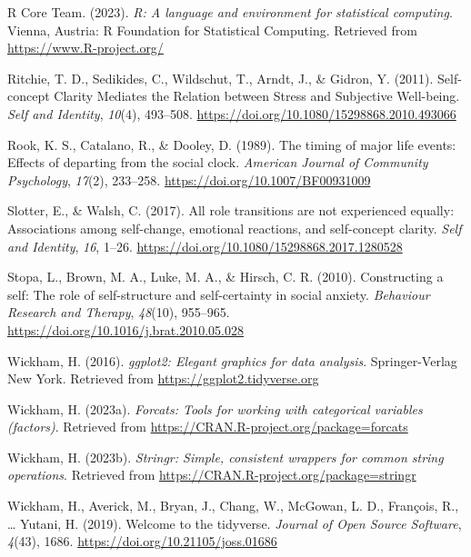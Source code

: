 \documentclass[
  man,floatsintext]{apa6}
\newlength{\cslhangindent}
\newlength{\cslentryspacingunit} %
\newenvironment{CSLReferences}[2] %
 {%
  \setlength{\parindent}{0pt}
  \ifodd #1
  \let\oldpar\par
  \def\par{\hangindent=\cslhangindent\oldpar}
  \fi
  \setlength{\parskip}{#2\cslentryspacingunit}
 }%
 {}
\begin{document}
\begin{CSLReferences}{1}{0}
\leavevmode{}%
R Core Team. (2023). \emph{R: A language and environment for statistical computing}. Vienna, Austria: R Foundation for Statistical Computing. Retrieved from \url{https://www.R-project.org/}

\leavevmode{}%
Ritchie, T. D., Sedikides, C., Wildschut, T., Arndt, J., \& Gidron, Y. (2011). Self-concept {Clarity Mediates} the {Relation} between {Stress} and {Subjective Well-being}. \emph{Self and Identity}, \emph{10}(4), 493--508. \url{https://doi.org/10.1080/15298868.2010.493066}

\leavevmode{}%
Rook, K. S., Catalano, R., \& Dooley, D. (1989). The timing of major life events: {Effects} of departing from the social clock. \emph{American Journal of Community Psychology}, \emph{17}(2), 233--258. \url{https://doi.org/10.1007/BF00931009}

\leavevmode{}%
Slotter, E., \& Walsh, C. (2017). All role transitions are not experienced equally: {Associations} among self-change, emotional reactions, and self-concept clarity. \emph{Self and Identity}, \emph{16}, 1--26. \url{https://doi.org/10.1080/15298868.2017.1280528}

\leavevmode{}%
Stopa, L., Brown, M. A., Luke, M. A., \& Hirsch, C. R. (2010). Constructing a self: {The} role of self-structure and self-certainty in social anxiety. \emph{Behaviour Research and Therapy}, \emph{48}(10), 955--965. \url{https://doi.org/10.1016/j.brat.2010.05.028}

\leavevmode{}%
Wickham, H. (2016). \emph{ggplot2: Elegant graphics for data analysis}. Springer-Verlag New York. Retrieved from \url{https://ggplot2.tidyverse.org}

\leavevmode{}%
Wickham, H. (2023a). \emph{Forcats: Tools for working with categorical variables (factors)}. Retrieved from \url{https://CRAN.R-project.org/package=forcats}

\leavevmode{}%
Wickham, H. (2023b). \emph{Stringr: Simple, consistent wrappers for common string operations}. Retrieved from \url{https://CRAN.R-project.org/package=stringr}

\leavevmode{}%
Wickham, H., Averick, M., Bryan, J., Chang, W., McGowan, L. D., François, R., \ldots{} Yutani, H. (2019). Welcome to the {tidyverse}. \emph{Journal of Open Source Software}, \emph{4}(43), 1686. \url{https://doi.org/10.21105/joss.01686}


\end{CSLReferences}
\end{document}
